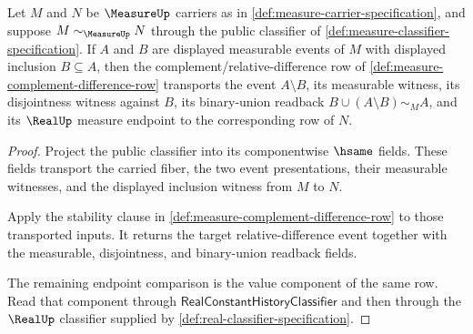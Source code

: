 \begin{theorem}
\label{thm:measure-complement-row-transport}
Let $M$ and $N$ be $\MeasureUp$ carriers as in
\autoref{def:measure-carrier-specification}, and suppose
$M\sim_{\MeasureUp}N$ through the public classifier of
\autoref{def:measure-classifier-specification}. If $A$ and $B$ are displayed
measurable events of $M$ with displayed inclusion $B\subseteq A$, then the
complement/relative-difference row of
\autoref{def:measure-complement-difference-row} transports the event
$A\setminus B$, its measurable witness, its disjointness witness against $B$,
its binary-union readback $B\cup(A\setminus B)\sim_M A$, and its $\RealUp$
measure endpoint to the corresponding row of $N$.
\end{theorem}
\begin{proof}
Project the public classifier into its componentwise $\hsame$ fields. These
fields transport the carried fiber, the two event presentations, their
measurable witnesses, and the displayed inclusion witness from $M$ to $N$.

Apply the stability clause in
\autoref{def:measure-complement-difference-row} to those transported inputs.
It returns the target relative-difference event together with the measurable,
disjointness, and binary-union readback fields.

The remaining endpoint comparison is the value component of the same row. Read
that component through $\mathsf{RealConstantHistoryClassifier}$ and then
through the $\RealUp$ classifier supplied by
\autoref{def:real-classifier-specification}.
\end{proof}

